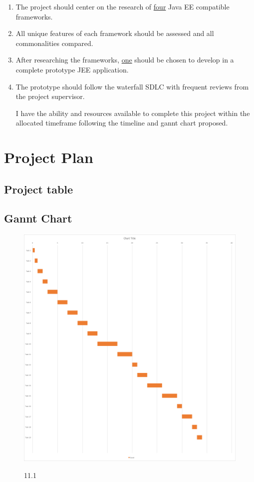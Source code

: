 \begin{enumerate}
	\item The project should center on the research of \underline{four} Java EE compatible frameworks.
	\item All unique features of each framework should be assessed and all commonalities compared.
	\item After researching the frameworks, \underline{one} should be chosen to develop in a complete prototype JEE application.
	\item The prototype should follow the waterfall SDLC with frequent reviews from the project supervisor.
	
	I have the ability and resources available to complete this project within the allocated timeframe following the timeline and gannt chart proposed. 
\end{enumerate}

\newpage

\section{Project Plan}
\subsection{Project table}

\newpage

\subsection{Gannt Chart}
\begin{figure}[!htb]
	\includegraphics[width=\textwidth]{img44.png}
	\begin{center}
		\figurename{ 11.1}
	\end{center}
\end{figure}